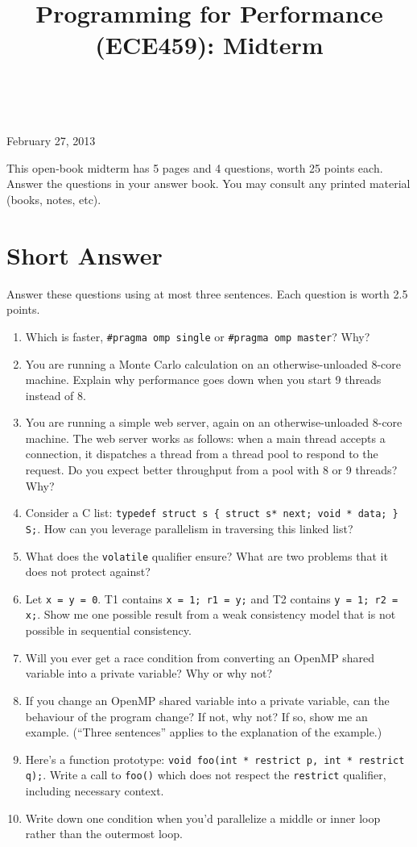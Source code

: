 \documentclass[12pt]{article}
\begin{document}
\title{Programming for Performance (ECE459): Midterm}
\author{}
\renewcommand{\today}{}
\maketitle

 ~\\[-8em]

\begin{center}
{\Large February 27, 2013}
\end{center}

This open-book midterm has 5 pages and 4 questions, worth 25 points each. Answer
the questions in your answer book. You may consult any printed
material (books, notes, etc).

\section{Short Answer}

Answer these questions using at most three sentences. Each question is worth
2.5 points.

\begin{enumerate}
\item Which is faster, {\tt \#pragma omp single} or {\tt \#pragma omp master}? Why?
\item You are running a Monte Carlo calculation on an otherwise-unloaded 8-core machine. Explain why performance goes down when you start 9 threads instead of 8.
\item You are running a simple web server, again on an otherwise-unloaded 8-core machine. The web server works as follows: when a main thread accepts a connection, it dispatches a thread from a thread pool to respond to the request. Do you expect better throughput from a pool with 8 or 9 threads? Why?
\item Consider a C list: \verb+typedef struct s { struct s* next; void * data; } S;+. How can you leverage parallelism in traversing this linked list? 
\item What does the {\tt volatile} qualifier ensure? What are two problems that it does not protect against?
\item Let {\tt x = y = 0}. T1 contains {\tt x = 1; r1 = y;} and T2 contains {\tt y = 1; r2 = x;}. Show me one possible result from a weak consistency model that is not possible in sequential consistency.
\item Will you ever get a race condition from converting an OpenMP shared variable into a private variable? Why or why not? 
\item If you change an OpenMP shared variable into a private variable, can the behaviour of the program change? If not, why not? If so, show me an example. (``Three sentences'' applies to the explanation of the example.)
\item Here's a function prototype: {\tt void foo(int * restrict p, int * restrict q);}. Write a call to {\tt foo()} which does not respect the {\tt restrict} qualifier, including necessary context. 
\item Write down one condition when you'd parallelize a middle or inner loop rather than the outermost loop.
\end{enumerate}
\end{document}
